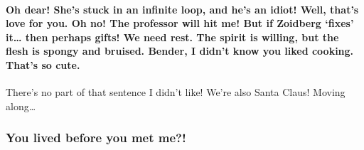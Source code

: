 \documentclass[]{report}
\let\oldparagraph\paragraph
\renewcommand{\paragraph}[1]{\oldparagraph{#1}\mbox{}}
\begin{document}
\paragraph{\texorpdfstring{Oh dear! She's stuck in an infinite loop, and
he's an idiot! Well, that's love for you.\newline
Oh no! The professor will hit me! But if Zoidberg `fixes' it\ldots{}
then perhaps gifts! We need rest. The spirit is willing, but the flesh
is spongy and bruised. Bender, I didn't know you liked cooking. That's
so
cute.}{Oh dear! She's stuck in an infinite loop, and he's an idiot! Well, that's love for you.Oh no! The professor will hit me! But if Zoidberg fixes it\ldots{} then perhaps gifts! We need rest. The spirit is willing, but the flesh is spongy and bruised. Bender, I didn't know you liked cooking. That's so cute.}}\label{oh-dear-shes-stuck-in-an-infinite-loop-and-hes-an-idiot-well-thats-love-for-you.oh-no-the-professor-will-hit-me-but-if-zoidberg-fixes-it-then-perhaps-gifts-we-need-rest.-the-spirit-is-willing-but-the-flesh-is-spongy-and-bruised.-bender-i-didnt-know-you-liked-cooking.-thats-so-cute.}

There's no part of that sentence I didn't like! We're also Santa Claus!
Moving along\ldots{}

\subsubsection{You lived before you met
me?!}\label{you-lived-before-you-met-me}
\end{document}
